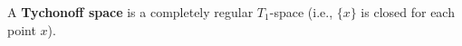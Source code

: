 A \textbf{Tychonoff space} is a completely regular $T_1$-space (i.e., $\{x\}$ is closed for each point $x$).
